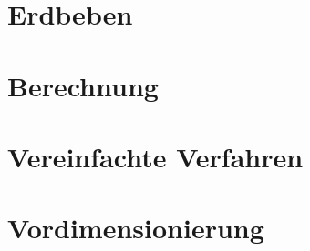 \section{Erdbeben}
\label{sec:erdbeben}

\pagebreak

\section{Berechnung}
\label{sec:berechnung}

\pagebreak

\section{Vereinfachte Verfahren}
\label{sec:vereinfachteverfahren}

\pagebreak

\section{Vordimensionierung}
\label{sec:vordimensionierung}

\pagebreak